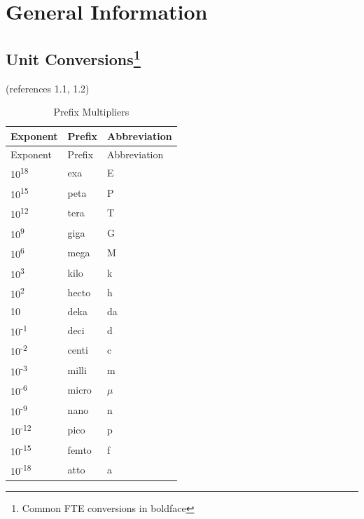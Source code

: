 \documentclass[
]{book}
\begin{document}
\hypertarget{general-information}{%
\chapter{General Information}\label{general-information}}

\hypertarget{unit-conversions}{%
\section[Unit Conversions]{\texorpdfstring{Unit Conversions\footnote{Common FTE conversions in boldface}}{Unit Conversions}}\label{unit-conversions}}

(references 1.1, 1.2)

\begin{longtable}[]{@{}lll@{}}
\caption{Prefix Multipliers}\tabularnewline
\toprule
Exponent & Prefix & Abbreviation\tabularnewline
\midrule
\endfirsthead
\toprule
Exponent & Prefix & Abbreviation\tabularnewline
\midrule
\endhead
10\textsuperscript{18} & exa & E\tabularnewline
10\textsuperscript{15} & peta & P\tabularnewline
10\textsuperscript{12} & tera & T\tabularnewline
10\textsuperscript{9} & giga & G\tabularnewline
10\textsuperscript{6} & mega & M\tabularnewline
10\textsuperscript{3} & kilo & k\tabularnewline
10\textsuperscript{2} & hecto & h\tabularnewline
10 & deka & da\tabularnewline
10\textsuperscript{-1} & deci & d\tabularnewline
10\textsuperscript{-2} & centi & c\tabularnewline
10\textsuperscript{-3} & milli & m\tabularnewline
10\textsuperscript{-6} & micro & \(\mu\)\tabularnewline
10\textsuperscript{-9} & nano & n\tabularnewline
10\textsuperscript{-12} & pico & p\tabularnewline
10\textsuperscript{-15} & femto & f\tabularnewline
10\textsuperscript{-18} & atto & a\tabularnewline
\bottomrule
\end{longtable}
\end{document}
